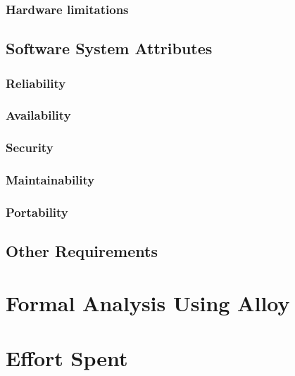 \documentclass[a4paper,12pt]{book}
\begin{document}
\subsection{Hardware limitations}

\newpage
\section{Software System Attributes}
\subsection{Reliability}
\subsection{Availability}
\subsection{Security}
\subsection{Maintainability}
\subsection{Portability}

\newpage
\section{Other Requirements}

\chapter{Formal Analysis Using Alloy}

\chapter{Effort Spent}
\end{document}
